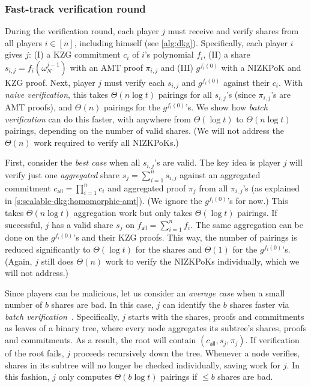 \subsubsection{Fast-track verification round}
\label{s:scalable-dkg:share-verif}
During the verification round, each player $j$ must receive and verify shares from all players $i\in[n]$, including himself (see \cref{alg:dkg}).
Specifically, each player $i$ gives $j$: (I) a KZG commitment $c_i$ of $i$'s polynomial $f_i$, (II) a share $s_{i,j}=f_i(\omega_N^{j-1})$ with an AMT proof $\pi_{i,j}$ and (III) $g^{f_i(0)}$ with a NIZKPoK and KZG proof.
Next, player $j$ must verify each $s_{i,j}$ and $g^{f_i(0)}$ against their $c_i$.
With \textit{naive verification}, this takes $\Theta(n\log{t})$ pairings for all $s_{i,j}$'s (since $\pi_{i,j}$'s are AMT proofs), and $\Theta(n)$ pairings for the $g^{f_i(0)}$'s.
We show how \textit{batch verification} can do this faster, with anywhere from $\Theta(\log{t})$ to $\Theta(n\log{t})$ pairings, depending on the number of valid shares.
(We will not address the $\Theta(n)$ work required to verify all NIZKPoKs.)

First, consider the \textit{best case} when all $s_{i,j}$'s are valid.
The key idea is player $j$ will verify just one \textit{aggregated} share $s_j = \sum_{i=1}^n s_{i,j}$ against an aggregated commitment $c_\mathsf{all}=\prod_{i=1}^n c_i$ and aggregated proof $\pi_j$ from all $\pi_{i,j}$'s (as explained in \cref{s:scalable-dkg:homomorphic-amt}).
(We ignore the $g^{f_i(0)}$'s for now.)
This takes $\Theta(n\log{t})$ aggregation work but only takes $\Theta(\log{t})$ pairings.
If successful, $j$ has a valid share $s_j$ on $f_\mathsf{all} = \sum_{i=1}^n f_i$.
The same aggregation can be done on the $g^{f_i(0)}$'s and their KZG proofs.
This way, the number of pairings is reduced significantly to $\Theta(\log{t})$ for the shares and $\Theta(1)$ for the $g^{f_i(0)}$'s.
(Again, $j$ still does $\Theta(n)$ work to verify the NIZKPoKs individually, which we will not address.)

Since players can be malicious, let us consider an \textit{average case} when a small number of $b$ shares are bad.
In this case, $j$ can identify the $b$ shares faster via \textit{batch verification}~\cite{Boldyreva2003Threshold}.
Specifically, $j$ starts with the shares, proofs and commitments as leaves of a binary tree, where every node aggregates its subtree's shares, proofs and commitments.
As a result, the root will contain $(c_\mathsf{all},s_j,\pi_j)$.
If verification of the root fails, $j$ proceeds recursively down the tree.
Whenever a node verifies, shares in its subtree will no longer be checked individually, saving work for $j$.
In this fashion, $j$ only computes $\Theta(b\log{t})$ pairings if $\le b$ shares are bad.

